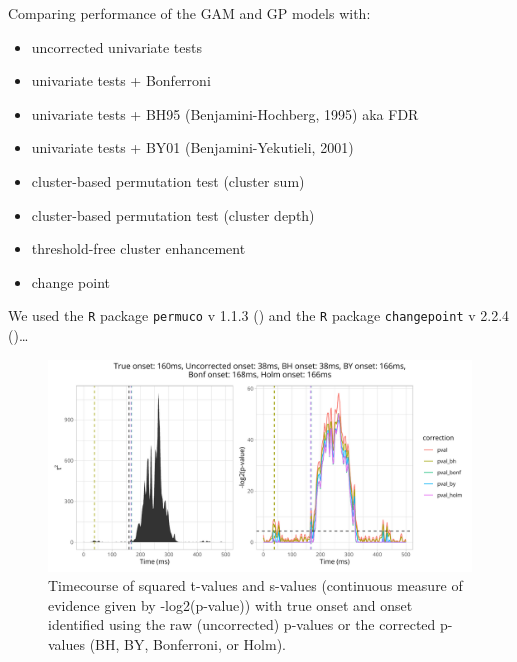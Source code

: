\documentclass[
  doc,
  floatsintext,
  longtable,
  a4paper,
  nolmodern,
  notxfonts,
  notimes,
  colorlinks=true,linkcolor=blue,citecolor=blue,urlcolor=blue]{apa7}
\providecommand{\tightlist}{%
  \setlength{\itemsep}{0pt}\setlength{\parskip}{0pt}}
\begin{document}
Comparing performance of the GAM and GP models with:

\begin{itemize}
\tightlist
\item
  uncorrected univariate tests
\item
  univariate tests + Bonferroni
\item
  univariate tests + BH95 (Benjamini-Hochberg, 1995) aka FDR
\item
  univariate tests + BY01 (Benjamini-Yekutieli, 2001)
\item
  cluster-based permutation test (cluster sum)
\item
  cluster-based permutation test (cluster depth)
\item
  threshold-free cluster enhancement
\item
  change point
\end{itemize}

We used the \texttt{R} package \texttt{permuco} v 1.1.3
() and the \texttt{R}
package \texttt{changepoint} v 2.2.4 ()\ldots{}

\begin{figure}[H]

\caption{Timecourse of squared t-values and s-values (continuous measure
of evidence given by -log2(p-value)) with true onset and onset
identified using the raw (uncorrected) p-values or the corrected
p-values (BH, BY, Bonferroni, or Holm).}

{\centering \includegraphics[width=1\textwidth,height=\textheight]{brms_meeg_files/figure-pdf/test-1d-1.pdf}

}

\end{figure}%
\end{document}
